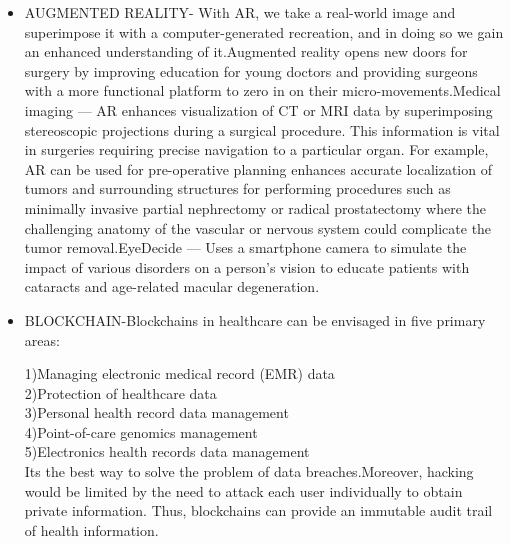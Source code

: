 \documentclass[12 pt]{article}
\begin{document}
\begin{itemize}
\item AUGMENTED REALITY- With AR, we take a real-world image and superimpose it with a computer-generated recreation, and in doing so we gain an enhanced understanding of it.Augmented reality opens new doors for surgery by improving education for young doctors and providing surgeons with a more functional platform to zero in on their micro-movements.Medical imaging — AR enhances visualization of CT or MRI data by superimposing stereoscopic projections during a surgical procedure. This information is vital in surgeries requiring precise navigation to a particular organ. For example, AR can be used for pre-operative planning enhances accurate localization of tumors and surrounding structures for performing procedures such as minimally invasive partial nephrectomy or radical prostatectomy where the challenging anatomy of the vascular or nervous system could complicate the tumor removal.EyeDecide — Uses a smartphone camera to simulate the impact of various disorders on a person’s vision to educate patients with cataracts and age-related macular degeneration.
\item BLOCKCHAIN-Blockchains in healthcare can be envisaged in five primary areas:

1)Managing electronic medical record (EMR) data\\
2)Protection of healthcare data\\
3)Personal health record data management\\
4)Point-of-care genomics management\\
5)Electronics health records data management\\Its the best way to solve the problem of data breaches.Moreover, hacking would be limited by the need to attack each user individually to obtain private information. Thus, blockchains can provide an immutable audit trail of health information.
\end{itemize}
\end{document}
